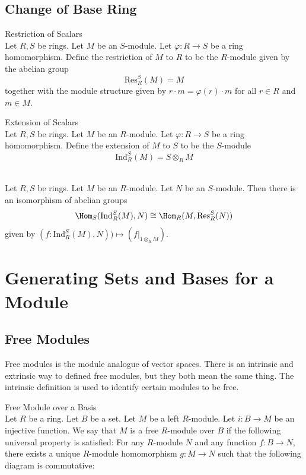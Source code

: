 \documentclass[a4paper]{article}
\begin{document}
\subsection{Change of Base Ring}
\begin{defn}{Restriction of Scalars}{}\\
Let $R,S$ be rings. Let $M$ be an $S$-module. Let $\varphi:R\to S$ be a ring homomorphism. Define the restriction of $M$ to $R$ to be the $R$-module given by the abelian group $$\text{Res}_R^S(M)=M$$ together with the module structure given by $r\cdot m=\varphi(r)\cdot m$ for all $r\in R$ and $m\in M$. 
\end{defn}

\begin{defn}{Extension of Scalars}{}\\
Let $R,S$ be rings. Let $M$ be an $R$-module. Let $\varphi:R\to S$ be a ring homomorphism. Define the extension of $M$ to $S$ to be the $S$-module $$\text{Ind}_R^S(M)=S\otimes_RM$$
\end{defn}

\begin{prp}{}{}\\
Let $R,S$ be rings. Let $M$ be an $R$-module. Let $N$ be an $S$-module. Then there is an isomorphism of abelian groups $$\Hom_S(\text{Ind}_R^S(M),N)\cong\Hom_R(M,\text{Res}_R^S(N))$$ given by $(f:\text{Ind}_R^S(M),N))\mapsto(f|_{1\otimes_RM})$. 
\end{prp}

\pagebreak
\section{Generating Sets and Bases for a Module}
\subsection{Free Modules}
Free modules is the module analogue of vector spaces. There is an intrinsic and extrinsic way to defined free modules, but they both mean the same thing. The intrinsic definition is used to identify certain modules to be free. 

\begin{defn}{Free Module over a Basis}{}\\
Let $R$ be a ring. Let $B$ be a set. Let $M$ be a left $R$-module. Let $i:B\to M$ be an injective function. We say that $M$ is a free $R$-module over $B$ if the following universal property is satisfied: For any $R$-module $N$ and any function $f:B\to N$, there exists a unique $R$-module homomorphism $g:M\to N$ such that the following diagram is commutative: \\~\\
\\
\end{defn}
\end{document}
